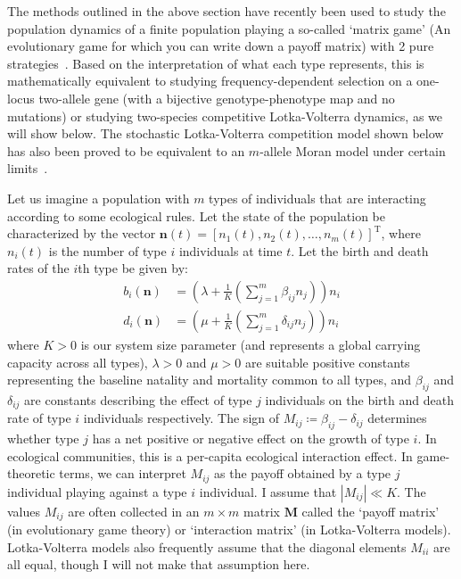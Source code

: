 The methods outlined in the above section have recently been used to study the population dynamics of a finite population playing a so-called `matrix game' (An evolutionary game for which you can write down a payoff matrix) with 2 pure strategies~\citep{tao_stochastic_2007}. Based on the interpretation of what each type represents, this is mathematically equivalent to studying frequency-dependent selection on a one-locus two-allele gene (with a bijective genotype-phenotype map and no mutations) or studying two-species competitive Lotka-Volterra dynamics, as we will show below. The stochastic Lotka-Volterra competition model shown below has also been proved to be equivalent to an $m$-allele Moran model under certain limits~\citep{constable_mapping_2017}.

Let us imagine a population with $m$ types of individuals that are interacting according to some ecological rules. Let the state of the population be characterized by the vector $\mathbf{n}(t) = [n_1(t),n_2(t),\ldots,n_m(t)]^{\mathrm{T}}$, where $n_i(t)$ is the number of type $i$ individuals at time $t$. Let the birth and death rates of the $i$th type be given by:
\begin{equation}
\label{nD_example_numbers_b_d_rates}
\begin{aligned}
b_i(\mathbf{n}) &= \left(\lambda + \frac{1}{K}\left(\sum\limits_{j=1}^{m}\beta_{ij}n_j\right)\right)n_i\\
d_i(\mathbf{n}) &= \left(\mu + \frac{1}{K}\left(\sum\limits_{j=1}^{m}\delta_{ij}n_j\right)\right)n_i
\end{aligned}
\end{equation}
where $K > 0$ is our system size parameter (and represents a global carrying capacity across all types), $\lambda > 0$ and $\mu > 0$ are suitable positive constants representing the baseline natality and mortality common to all types, and $\beta_{ij}$ and $\delta_{ij}$ are constants describing the effect of type $j$ individuals on the birth and death rate of type $i$ individuals respectively. The sign of $M_{ij} \coloneqq \beta_{ij} - \delta_{ij}$ determines whether type $j$ has a net positive or negative effect on the growth of type $i$. In ecological communities, this is a per-capita ecological interaction effect. In game-theoretic terms, we can interpret $M_{ij}$ as the payoff obtained by a type $j$ individual playing against a type $i$ individual. I assume that $| M_{ij} | \ll K$. The values $M_{ij}$ are often collected in an $m \times m$ matrix $\mathbf{M}$ called the `payoff matrix' (in evolutionary game theory) or `interaction matrix' (in Lotka-Volterra models). Lotka-Volterra models also frequently assume that the diagonal elements $M_{ii}$ are all equal, though I will not make that assumption here.

